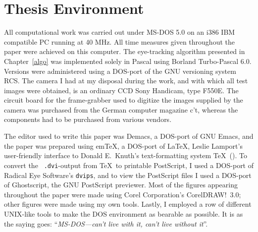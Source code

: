 
\section{Thesis Environment}
\label{intro:env}

All computational work was carried out under MS-DOS 5.0 on an i386 IBM
compatible PC running at 40 MHz.  All time measures given throughout
the paper were achieved on this computer.  The eye-tracking algorithm
{\octopus} presented in Chapter~\ref{algo} was implemented solely in
Pascal using Borland Turbo-Pascal 6.0.  Versions were administered
using a DOS-port of the GNU versioning system RCS.  The camera I had
at my disposal during the work, and with which all test images were
obtained, is an ordinary CCD Sony Handicam, type F550E.  The circuit
board for the frame-grabber used to digitize the images supplied by
the camera was purchased from the German computer magazine {\sf
  c't\/}, whereas the components had to be purchased from various
vendors.

The editor used to write this paper was Demacs, a DOS-port of GNU
Emacs, and the paper was prepared using em\TeX, a DOS-port of \LaTeX,
Leslie Lamport's user-friendly interface to Donald E.\ Knuth's
text-formatting system \TeX\ (\cite{lamport}).  To convert the {\tt
  .dvi}-output from \TeX\ to printable PostScript, I used a DOS-port
of Radical Eye Software's {\tt dvips}, and to view the PostScript
files I used a DOS-port of Ghostscript, the GNU PostScript previewer.
Most of the figures appearing throughout the paper were made using
Corel Corporation's CorelDRAW!\ 3.0; other figures were made using my
own tools.  Lastly, I employed a row of different UNIX-like tools to
make the DOS environment as bearable as possible.  It is as the saying
goes: ``{\em MS-DOS---can't live with it, can't live without it\/}''.
